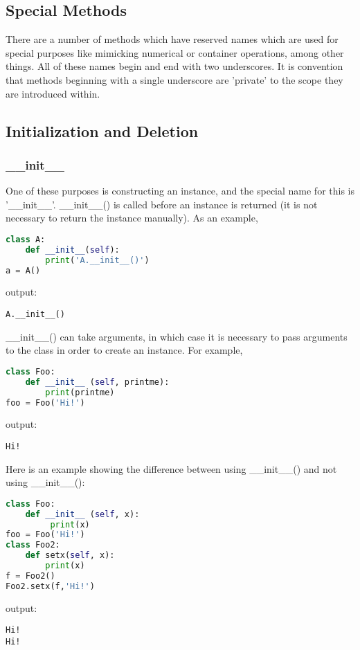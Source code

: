 \subsection{Special Methods}
There are a number of methods which have reserved names which are used for
special purposes like mimicking numerical or container operations, among other
things. All of these names begin and end with two underscores. It is convention
that methods beginning with a single underscore are 'private' to the scope they
are introduced within.

\subsection{Initialization and Deletion}
\subsubsection{\_\_init\_\_}
One of these purposes is constructing an instance, and the special name for this
is '\_\_init\_\_'. \_\_init\_\_() is called before an instance is returned (it is not
necessary to return the instance manually). As an example,
\lstset{basicstyle=\scriptsize, numbers=left, captionpos=b, tabsize=4}
\begin{lstlisting}[caption=Init Methode,language={Python},
xleftmargin=15pt, label=lst:initmethode]
class A:
    def __init__(self):
        print('A.__init__()')
a = A()
\end{lstlisting}

output:
\scriptsize
\begin{verbatim}
A.__init__()
\end{verbatim}
\normalsize
\_\_init\_\_() can take arguments, in which case it is necessary to pass arguments
to the class in order to create an instance. For example,
\lstset{basicstyle=\scriptsize, numbers=left, captionpos=b, tabsize=4}
\begin{lstlisting}[caption=Init Arguments,language={Python},
xleftmargin=15pt, label=lst:initarguments]
class Foo:
    def __init__ (self, printme):
        print(printme)
foo = Foo('Hi!')
\end{lstlisting}

output:
\scriptsize
\begin{verbatim}
Hi!
\end{verbatim}
\normalsize

Here is an example showing the difference between using \_\_init\_\_() and not using
\_\_init\_\_():
\lstset{basicstyle=\scriptsize, numbers=left, captionpos=b, tabsize=4}
\begin{lstlisting}[caption=Difference,language={Python},
xleftmargin=15pt, label=lst:difference]
class Foo:
    def __init__ (self, x):
         print(x)
foo = Foo('Hi!')
class Foo2:
    def setx(self, x):
        print(x)
f = Foo2()
Foo2.setx(f,'Hi!')
\end{lstlisting}
output:
\scriptsize
\begin{verbatim}
Hi!
Hi!
\end{verbatim}
\normalsize

